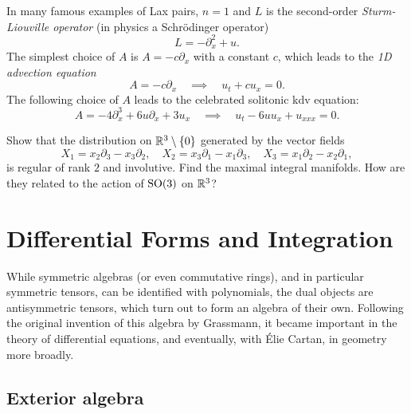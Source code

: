 \begin{example}
    In many famous examples of Lax pairs, $n=1$ and $L$ is the second-order \emph{Sturm-Liouville operator} (in physics a Schr\"odinger operator)
    \[L=-\partial_x^2+u.\]
    The simplest choice of $A$ is $A=-c\partial_x$ with a constant $c$, which leads to the \emph{1D advection equation}
    \[A=-c\partial_x\quad \implies \quad u_t+c u_x=0.\]
    The following choice of $A$ leads to the celebrated solitonic \gls{kdv} equation:
    \[A=-4\partial_x^3+6u\partial_x+3u_x\quad \implies\quad u_t-6uu_x+u_{xxx}=0.\label{eq kdv}\]
\end{example}


\begin{xca}
    Show that the distribution on $\mathbb{R}^3\setminus \{0\}$ generated by the vector fields
    \[X_1=x_2\partial_3-x_3\partial_2,\quad X_2=x_3\partial_1-x_1\partial_3,\quad X_3=x_1\partial_2-x_2\partial_1,\]
    is regular of rank $2$ and involutive. Find the maximal integral manifolds. How are they related to the action of $\operatorname{SO}(3)$ on $\mathbb{R}^3$?
\end{xca}











\clearpage
\chapter{Differential Forms and Integration}\label{sec: differential forms}


While symmetric algebras (or even commutative rings), and in particular symmetric tensors, can be identified with polynomials, the dual objects are antisymmetric tensors, which turn out to form an algebra of their own. Following the original invention of this algebra by Grassmann, it became important in the theory of differential equations, and eventually, with \'Elie Cartan, in geometry more broadly.


\section{Exterior algebra}



